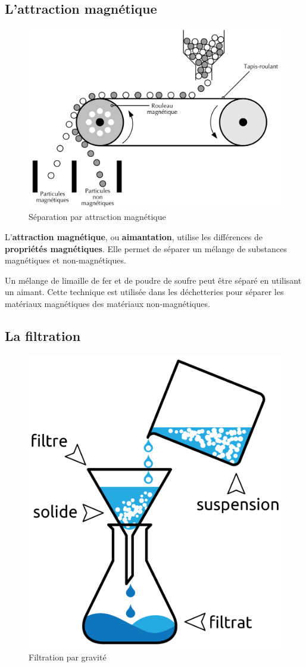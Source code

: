 \documentclass[
  11pt,
  french,
  a4paper,
  openany]{book}
\begin{document}
\hypertarget{lattraction-magnuxe9tique}{%
\subsection{L'attraction magnétique}\label{lattraction-magnuxe9tique}}

\begin{figure}

{\centering \includegraphics[width=0.38\linewidth]{images/attraction-magnetique} 

}

\caption{Séparation par attraction magnétique}\label{fig:attraction-magnetique}
\end{figure}

L'\textbf{attraction magnétique}, ou \textbf{aimantation}, utilise les différences de \textbf{propriétés magnétiques}. Elle permet de séparer un mélange de substances magnétiques et non-magnétiques.

Un mélange de limaille de fer et de poudre de soufre peut être séparé en utilisant un aimant. Cette technique est utilisée dans les déchetteries pour séparer les matériaux magnétiques des matériaux non-magnétiques.

\hypertarget{la-filtration}{%
\subsection{La filtration}\label{la-filtration}}

\begin{figure}

{\centering \includegraphics[width=0.28\linewidth]{images/filtration} 

}

\caption{Filtration par gravité}\label{fig:filtration}
\end{figure}
\end{document}
